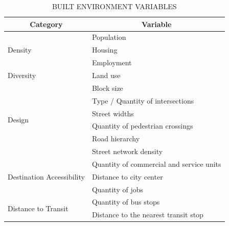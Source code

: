 \begin{table}[!hbtp]
    \footnotesize
    \captionsetup{justification=raggedright,
        singlelinecheck=false,
        font=footnotesize}
    \caption{BUILT ENVIRONMENT VARIABLES}
    \centering
    \begin{tabular}{ll}
        \hline
        \multicolumn{1}{c}{\textbf{Category}}                          & \multicolumn{1}{c}{\textbf{Variable}}                        \\ \hline
        \multirow{3}{*}{Density}                   & Population                               \\
                                                   & Housing                                  \\
                                                   & Employment                               \\ \hline
        \multirow{1}{*}{Diversity}                 & Land use                                 \\
                                                   \hline
        \multirow{6}{*}{Design}                    & Block size                               \\
                                                   & Type / Quantity of intersections                \\
                                                   & Street widths                            \\
                                                   & Quantity of pedestrian crossings         \\
                                                   & Road hierarchy \\
                                                   & Street network density \\
                                                    \hline
        \multirow{3}{*}{Destination Accessibility} & Quantity of commercial and service units \\
                                                   & Distance to city center                  \\
                                                   & Quantity of jobs                         \\ \hline
        \multirow{2}{*}{Distance to Transit}       & Quantity of bus stops                    \\
                                                   & Distance to the nearest transit stop         \\

\end{tabular}
\end{table}
